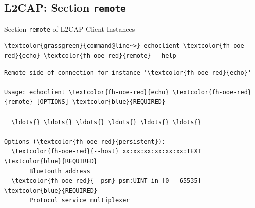 \subsection{L2CAP: Section \textcolor{fh-ooe-red}{\lstinline|remote|}}

\begin{frame}[fragile]{Section \alert{\lstinline|remote|} of L2CAP Client Instances}

\begin{scriptsize}
\begin{Verbatim}[commandchars=\\\{\}]
\textcolor{grassgreen}{command@line~>} echoclient \textcolor{fh-ooe-red}{echo} \textcolor{fh-ooe-red}{remote} --help
\end{Verbatim}
\begin{Verbatim}[commandchars=\\\{\},frame=leftline,rulecolor=\color{fh-ooe-red}]
Remote side of connection for instance '\textcolor{fh-ooe-red}{echo}'

Usage: echoclient \textcolor{fh-ooe-red}{echo} \textcolor{fh-ooe-red}{remote} [OPTIONS] \textcolor{blue}{REQUIRED}

  \ldots{} \ldots{} \ldots{} \ldots{} \ldots{} \ldots{}

Options (\textcolor{fh-ooe-red}{persistent}):
  \textcolor{fh-ooe-red}{--host} xx:xx:xx:xx:xx:xx:TEXT \textcolor{blue}{REQUIRED}
       Bluetooth address
  \textcolor{fh-ooe-red}{--psm} psm:UINT in [0 - 65535] \textcolor{blue}{REQUIRED}
       Protocol service multiplexer
\end{Verbatim}
\end{scriptsize}
\end{frame}
